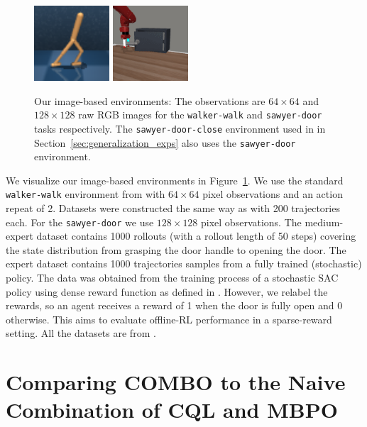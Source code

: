 \begin{figure}[ht]
    \centering
    \includegraphics[width=0.25\textwidth]{chapters/combo/walker_task.png}
    \includegraphics[width=0.25\textwidth]{chapters/combo/dooropen_task.png}
    \vspace{-0.2cm}
    \caption{\footnotesize Our image-based environments: The observations are $64\times 64$ and $128\times 128$ raw RGB images for the \texttt{walker-walk} and \texttt{sawyer-door} tasks respectively. The \texttt{sawyer-door-close} environment used in in Section~\ref{sec:generalization_exps} also uses the \texttt{sawyer-door} environment.}
    \label{fig:visual}
\end{figure}


We visualize our image-based environments in Figure~\ref{fig:visual}. We use the standard \texttt{walker-walk} environment from \citet{tassa2018deepmind} with $64\times64$ pixel observations and an action repeat of 2. Datasets were constructed the same way as \citet{fu2020d4rl} with 200 trajectories each. For the \texttt{sawyer-door} we use $128\times128$ pixel observations. The medium-expert dataset contains 1000 rollouts (with a rollout length of 50 steps) covering the state distribution from grasping the door handle to opening the door. The expert dataset contains 1000 trajectories samples from a fully trained (stochastic) policy. The data was obtained from the training process of a stochastic SAC policy using dense reward function as defined in \citet{yu2020meta}. However, we relabel the rewards, so an agent receives a reward of 1 when the door is fully open and 0 otherwise. This aims to evaluate offline-RL performance in a sparse-reward setting. All the datasets are from \citep{Rafailov2020LOMPO}.


\section{Comparing COMBO to the Naive Combination of CQL and MBPO}
\label{app:cql_mbpo}

